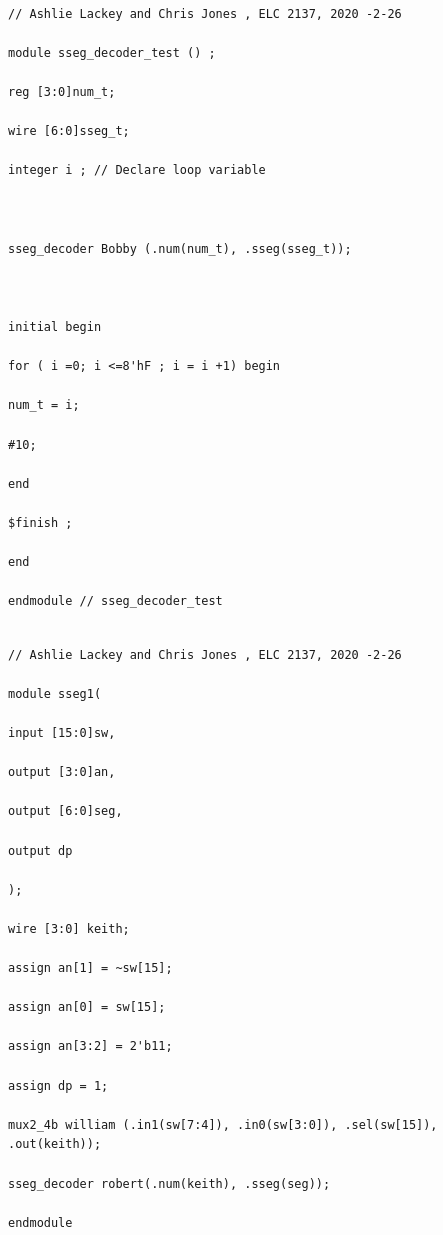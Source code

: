 \documentclass[11pt]{article}
\begin{document}
\begin{lstlisting}[style=Verilog,caption=sseg Decoder Testbench Code,label=code:ex ]

// Ashlie Lackey and Chris Jones , ELC 2137, 2020 -2-26

module sseg_decoder_test () ;

reg [3:0]num_t;

wire [6:0]sseg_t;

integer i ; // Declare loop variable



sseg_decoder Bobby (.num(num_t), .sseg(sseg_t));



initial begin

for ( i =0; i <=8'hF ; i = i +1) begin

num_t = i;

#10;

end

$finish ;

end

endmodule // sseg_decoder_test

\end{lstlisting}



\begin{lstlisting}[style=Verilog,caption=Top-level Module Code,label=code:ex ]

// Ashlie Lackey and Chris Jones , ELC 2137, 2020 -2-26

module sseg1(

input [15:0]sw,

output [3:0]an,

output [6:0]seg,

output dp

);

wire [3:0] keith;

assign an[1] = ~sw[15];

assign an[0] = sw[15];

assign an[3:2] = 2'b11;

assign dp = 1;

mux2_4b william (.in1(sw[7:4]), .in0(sw[3:0]), .sel(sw[15]), .out(keith));

sseg_decoder robert(.num(keith), .sseg(seg));

endmodule

\end{lstlisting}
\end{document}
